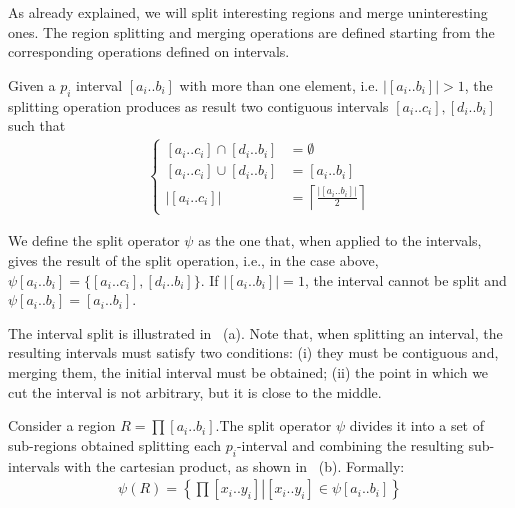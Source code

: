 As already explained, we will split interesting regions and merge uninteresting ones. The region splitting and merging operations are defined starting from the corresponding operations defined on intervals.
\begin{definition}
Given a $p_i$ interval $\left[a_{i}..b_{i}\right]$ with more than one element, i.e. $\left|\left[a_{i}..b_{i}\right]\right|>1$, the splitting operation produces as result two contiguous intervals $\left[a_{i}..c_{i}\right],\left[d_{i}..b_{i}\right]$
 such that
	\begin{align}
		\begin{cases}
		\left[a_{i}..c_{i}\right]\cap\left[d_{i}..b_{i}\right] & =\emptyset\\
		\left[a_{i}..c_{i}\right]\cup\left[d_{i}..b_{i}\right] & =\left[a_{i}..b_{i}\right]\\
		\left|\left[a_{i}..c_{i}\right]\right| & =\left\lceil \frac{\left|\left[a_{i}..b_{i}\right]\right|}{2}\right\rceil 
		\end{cases}
	\end{align}

We define the split operator $\psi$ as the one that, when applied to the intervals, gives the result of the split operation, i.e., in the case above, $\psi \left[a_{i}..b_{i}\right]=\lbrace \left[a_{i}..c_{i}\right],\left[d_{i}..b_{i}\right] \rbrace$.
If $\left|\left[a_{i}..b_{i}\right]\right|=1$, the interval
cannot be split and $\psi \left[a_{i}..b_{i}\right]=\left[a_{i}..b_{i}\right]$.
\end{definition}

The interval split is illustrated in ~(a). Note that, when splitting an interval, the resulting intervals must satisfy two conditions: (i) they must be contiguous and, merging them, the initial interval must be obtained; (ii) the point in which we cut the interval is not arbitrary, but it is close to the middle.

\begin{definition}
\label{pers02.def:Splitting-a-region}
Consider a region $R=\prod\left[a_{i}..b_{i}\right]$.The split operator $\psi$ divides it into a set of sub-regions obtained splitting each $p_i$-interval and combining the resulting sub-intervals with the cartesian product, as shown in ~(b). Formally:
	\begin{align}
		\psi(R) = \left\{ \left.\prod\left[x_{i}..y_{i}\right]\right|\left[x_{i}..y_{i}\right]\in \psi\left[a_{i}..b_{i}\right]  \right\} 
	\end{align}

\end{definition}


